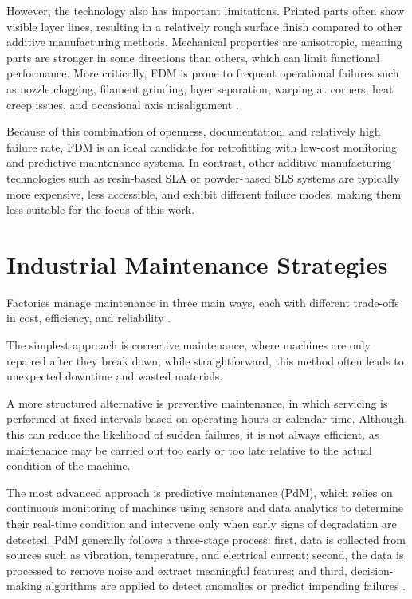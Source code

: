 However, the technology also has important limitations. Printed parts often show visible layer lines, resulting in a relatively rough surface finish compared to other additive manufacturing methods. Mechanical properties are anisotropic, meaning parts are stronger in some directions than others, which can limit functional performance. More critically, FDM is prone to frequent operational failures such as nozzle clogging, filament grinding, layer separation, warping at corners, heat creep issues, and occasional axis misalignment \cite{daminabo2020fdm,turner2014review}.

Because of this combination of openness, documentation, and relatively high failure rate, FDM is an ideal candidate for retrofitting with low-cost monitoring and predictive maintenance systems. In contrast, other additive manufacturing technologies such as resin-based SLA or powder-based SLS systems are typically more expensive, less accessible, and exhibit different failure modes, making them less suitable for the focus of this work.

\section{Industrial Maintenance Strategies}

Factories manage maintenance in three main ways, each with different trade-offs in cost, efficiency, and reliability \cite{thomas2021maintenance,jardine2006review}.

The simplest approach is corrective maintenance, where machines are only repaired after they break down; while straightforward, this method often leads to unexpected downtime and wasted materials.

A more structured alternative is preventive maintenance, in which servicing is performed at fixed intervals based on operating hours or calendar time. Although this can reduce the likelihood of sudden failures, it is not always efficient, as maintenance may be carried out too early or too late relative to the actual condition of the machine.

The most advanced approach is predictive maintenance (PdM), which relies on continuous monitoring of machines using sensors and data analytics to determine their real-time condition and intervene only when early signs of degradation are detected. PdM generally follows a three-stage process: first, data is collected from sources such as vibration, temperature, and electrical current; second, the data is processed to remove noise and extract meaningful features; and third, decision-making algorithms are applied to detect anomalies or predict impending failures \cite{jardine2006review}.

